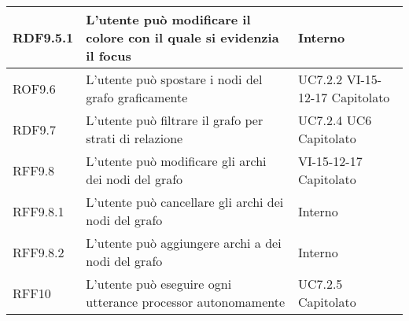 \documentclass[../AnalisideiRequisiti.tex]{subfiles}
\begin{document}
\begin{longtable}{| p{3cm} | p{6cm} | p{3cm} |}
		\newline RDF9.5.1&
		\newline L'utente può modificare il colore con il quale si evidenzia il focus&
		\newline Interno
		\\[1em]
		\hline
		
		\newline ROF9.6&
		\newline L'utente può spostare i nodi del grafo graficamente&
		\newline UC7.2.2 \newline VI-15-12-17 \newline Capitolato
		\\[1em]
		\hline
		
		\newline RDF9.7&
		\newline L'utente può filtrare il grafo per strati di relazione&
		\newline UC7.2.4 \newline UC6 \newline Capitolato
		\\[1em]
		\hline
	
		\newline RFF9.8&
		\newline L'utente può modificare gli archi dei nodi del grafo&
		\newline VI-15-12-17 \newline Capitolato
		\\[1em]
		\hline
		
		\newline RFF9.8.1&
		\newline L'utente può cancellare gli archi dei nodi del grafo&
		\newline Interno
		\\[1em]
		\hline
		
		\newline RFF9.8.2&
		\newline L'utente può aggiungere archi a dei nodi del grafo&
		\newline Interno
		\\[1em]
		\hline
	
		
		\newline RFF10&
		\newline L'utente può eseguire ogni utterance processor autonomamente&
		\newline UC7.2.5 \newline Capitolato
		\\[1em]
		\hline
	

\end{longtable}
\end{document}
